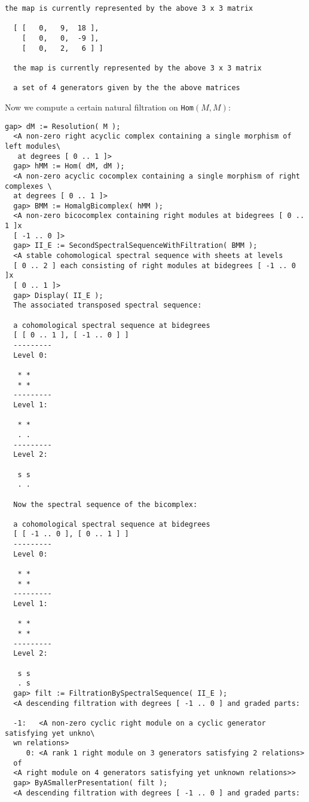 \documentclass[a4paper,11pt]{report}
\begin{document}
{{{\begin{Verbatim}[fontsize=\small,frame=single,label=Example]
  the map is currently represented by the above 3 x 3 matrix
  
  [ [   0,   9,  18 ],
    [   0,   0,  -9 ],
    [   0,   2,   6 ] ]
  
  the map is currently represented by the above 3 x 3 matrix
  
  a set of 4 generators given by the the above matrices
\end{Verbatim}
 Now we compute a certain natural filtration on \texttt{Hom}$(M,M)$: 
\begin{Verbatim}[fontsize=\small,frame=single,label=Example]
  gap> dM := Resolution( M );
  <A non-zero right acyclic complex containing a single morphism of left modules\
   at degrees [ 0 .. 1 ]>
  gap> hMM := Hom( dM, dM );
  <A non-zero acyclic cocomplex containing a single morphism of right complexes \
  at degrees [ 0 .. 1 ]>
  gap> BMM := HomalgBicomplex( hMM );
  <A non-zero bicocomplex containing right modules at bidegrees [ 0 .. 1 ]x
  [ -1 .. 0 ]>
  gap> II_E := SecondSpectralSequenceWithFiltration( BMM );
  <A stable cohomological spectral sequence with sheets at levels 
  [ 0 .. 2 ] each consisting of right modules at bidegrees [ -1 .. 0 ]x
  [ 0 .. 1 ]>
  gap> Display( II_E );
  The associated transposed spectral sequence:
  
  a cohomological spectral sequence at bidegrees
  [ [ 0 .. 1 ], [ -1 .. 0 ] ]
  ---------
  Level 0:
  
   * *
   * *
  ---------
  Level 1:
  
   * *
   . .
  ---------
  Level 2:
  
   s s
   . .
  
  Now the spectral sequence of the bicomplex:
  
  a cohomological spectral sequence at bidegrees
  [ [ -1 .. 0 ], [ 0 .. 1 ] ]
  ---------
  Level 0:
  
   * *
   * *
  ---------
  Level 1:
  
   * *
   * *
  ---------
  Level 2:
  
   s s
   . s
  gap> filt := FiltrationBySpectralSequence( II_E );
  <A descending filtration with degrees [ -1 .. 0 ] and graded parts:
    
  -1:	<A non-zero cyclic right module on a cyclic generator satisfying yet unkno\
  wn relations>
     0:	<A rank 1 right module on 3 generators satisfying 2 relations>
  of
  <A right module on 4 generators satisfying yet unknown relations>>
  gap> ByASmallerPresentation( filt );
  <A descending filtration with degrees [ -1 .. 0 ] and graded parts:
    

\end{Verbatim}}}}
\end{document}
